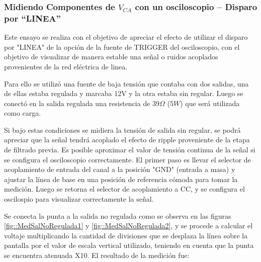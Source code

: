 \vspace{0.5cm}
\subsubsection{Midiendo Componentes de $V_{CA}$ con un osciloscopio – Disparo por “LINEA”}

Este ensayo se realiza con el objetivo de apreciar el efecto de utilizar el disparo por "LINEA" de la opción de la fuente de TRIGGER del osciloscopio, con el objetivo de visualizar de manera estable una señal o ruidos acoplados provenientes de la red eléctrica de linea.

Para ello se utilizó una fuente de baja tensión que contaba con dos salidas, una de ellas estaba regulada y marcaba 12V y la otra estaba sin regular. Luego se conectó en la salida regulada una resistencia de $39 \Omega$ ($5 W$) que será utilizada como carga. 

Si bajo estas condiciones se midiera la tensión de salida sin regular, se podrá apreciar que la señal tendrá acoplado el efecto de ripple proveniente de la etapa de filtrado previa. Es posible aproximar el valor de tensión continua de la señal si se configura el osciloscopio correctamente. El primer paso es llevar el selector de acoplamiento de entrada del canal a la
posición "GND" (entrada a masa) y ajustar la línea de base en una posición de referencia cómoda para tomar la medición. Luego se retorna el selector de acoplamiento a CC, y se configura el oscilospio para visualizar correctamente la señal.

\begin{table}[H]
    \centering
        \def\tablename{Tabla} 
        \caption{Cuadro de Controles}
        \label{tab:cont3}
\end{table}

Se conecta la punta a la salida no regulada como se observa en las figuras \ref{fig::MedSalNoRegulada1} y \ref{fig::MedSalNoRegulada2}, y se procede a calcular el voltaje multiplicando la cantidad de divisiones que se desplaza la línea sobre la pantalla por el valor de escala vertical utilizado, teniendo en cuenta que la punta se encuentra atenuada X10. El resultado de la medición fue:

